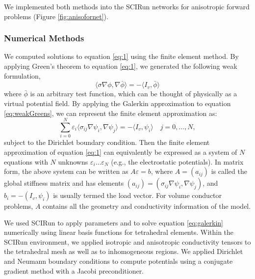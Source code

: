We implemented both methods into the SCIRun networks for anisotropic forward problems (Figure \ref{fig:anisofornet}). 

\subsubsection{Numerical Methods}
\label{sec:numerical}


We computed solutions to equation \ref{eq:1} using the finite element method. By applying Green's theorem to equation \ref{eq:1}, we generated the following weak formulation,
\begin{equation}
\label{eq:weakGreens}
\langle \sigma \nabla \phi, \nabla \bar{\phi} \rangle = -\langle I_v, \bar{\phi} \rangle
\end{equation}
where $ \bar{\phi}$ is an arbitrary test function, which can be thought of physically as a virtual potential field. By applying the Galerkin approximation to equation \ref{eq:weakGreens}, we can represent the finite element approximation as:
\begin{equation}
\label{eq:galerkin}
\sum_{i = 0}^{N} \varepsilon_i \langle \sigma_{ij} \nabla \psi_{i}, \nabla \psi_{j} \rangle = -\langle I_v, \psi_i \rangle \quad j = 0, \dots, N,
\end{equation}
subject to the Dirichlet boundary condition. Then the finite element approximation of equation \ref{eq:1} can equivalently be expressed as a system of $N$ equations with $N$ unknowns $\varepsilon_i \dots \varepsilon_N$ (e.g., the electrostatic potentials). In matrix form, the above system can be written as $A \varepsilon = b$,  where $A=(a_{ij})$ is called the global stiffness matrix and has elements $(a_{ij}) = (\sigma_{ij} \nabla \psi_{i}, \nabla \psi_{j})$, and $b_i = -(I_v, \psi_i)$ is usually termed the load vector. For volume conductor problems, $A$ contains all the geometry and conductivity information of the model. \cite{SCI:Joh2015c}

We used SCIRun to apply parameters and to solve equation \ref{eq:galerkin} numerically using linear basis functions for tetrahedral elements. Within the SCIRun environment, we applied isotropic and anisotropic conductivity tensors to the tetrahedral mesh as well as to inhomogeneous regions. We applied Dirichlet and Neumann boundary conditions to compute potentials using a conjugate gradient method with a Jacobi preconditioner.

